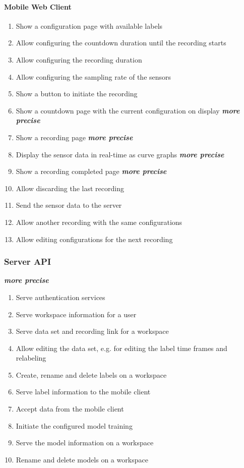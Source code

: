 \paragraph{Mobile Web Client}
\begin{enumerate}[resume*]
    \item Show a configuration page with available labels
    \item Allow configuring the countdown duration until the recording starts
    \item Allow configuring the recording duration
    \item Allow configuring the sampling rate of the sensors
    \item Show a button to initiate the recording
    \item Show a countdown page with the current configuration on display \textbf{\emph{more precise}}
    \item Show a recording page \textbf{\emph{more precise}}
    \item Display the sensor data in real-time as curve graphs \textbf{\emph{more precise}}
    \item Show a recording completed page \textbf{\emph{more precise}}
    \item Allow discarding the last recording
    \item Send the sensor data to the server
    \item Allow another recording with the same configurations
    \item Allow editing configurations for the next recording
\end{enumerate}

\subsubsection{Server API} \textbf{\emph{more precise}}
\begin{enumerate}[resume*]
    \item Serve authentication services
    \item Serve workspace information for a user
    \item Serve data set and recording link for a workspace
    \item Allow editing the data set, e.g. for editing the label time frames and relabeling
    \item Create, rename and delete labels on a workspace
    \item Serve label information to the mobile client
    \item Accept data from the mobile client
    \item Initiate the configured model training
    \item Serve the model information on a workspace
    \item Rename and delete models on a workspace
\end{enumerate}


